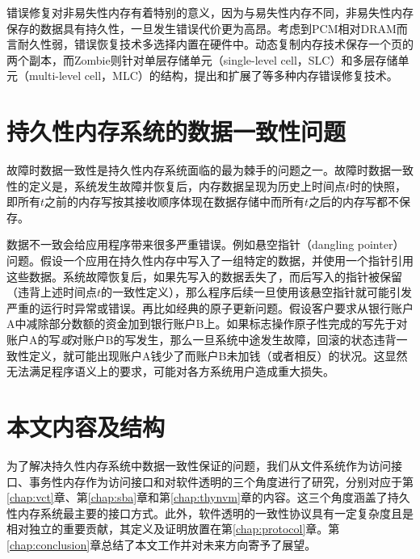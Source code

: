 错误修复对非易失性内存有着特别的意义，因为与易失性内存不同，非易失性内存保存的数据具有持久性，一旦发生错误代价更为高昂。考虑到PCM相对DRAM而言耐久性弱，错误恢复技术多选择内置在硬件中。动态复制内存技术\cite{Ipek:2010:DRM:1736020.1736023}保存一个页的两个副本，而Zombie\cite{Azevedo:2013:ZME:2485922.2485961}则针对单层存储单元（single-level cell，SLC）和多层存储单元（multi-level cell，MLC）的结构，提出和扩展了等多种内存错误修复技术。

\section{持久性内存系统的数据一致性问题}
\label{intro:crash-consistency}

故障时数据一致性是持久性内存系统面临的最为棘手的问题之一\cite{Onur:2014:RPO}。故障时数据一致性的定义是，系统发生故障并恢复后，内存数据呈现为历史上时间点$t$时的快照，即所有$t$之前的内存写按其接收顺序体现在数据存储中而所有$t$之后的内存写都不保存。

数据不一致会给应用程序带来很多严重错误。例如悬空指针（dangling pointer）问题\cite{Volos:2011:MLP:1950365.1950379,Coburn:2011:NMP:1950365.1950380}。假设一个应用在持久性内存中写入了一组特定的数据，并使用一个指针引用这些数据。系统故障恢复后，如果先写入的数据丢失了，而后写入的指针被保留（违背上述时间点$t$的一致性定义），那么程序后续一旦使用该悬空指针就可能引发严重的运行时异常或错误。再比如经典的原子更新问题。假设客户要求从银行账户A中减除部分数额的资金加到银行账户B上。如果标志操作原子性完成的写先于对账户A的写\emph{或}对账户B的写发生，那么一旦系统中途发生故障，回滚的状态违背一致性定义，就可能出现账户A钱少了而账户B未加钱（或者相反）的状况。这显然无法满足程序语义上的要求，可能对各方系统用户造成重大损失。

\section{本文内容及结构}

为了解决持久性内存系统中数据一致性保证的问题，我们从文件系统作为访问接口、事务性内存作为访问接口和对软件透明的三个角度进行了研究，分别对应于第\ref{chap:vct}章、第\ref{chap:sba}章和第\ref{chap:thynvm}章的内容。这三个角度涵盖了持久性内存系统最主要的接口方式。此外，软件透明的一致性协议具有一定复杂度且是相对独立的重要贡献，其定义及证明放置在第\ref{chap:protocol}章。第\ref{chap:conclusion}章总结了本文工作并对未来方向寄予了展望。

